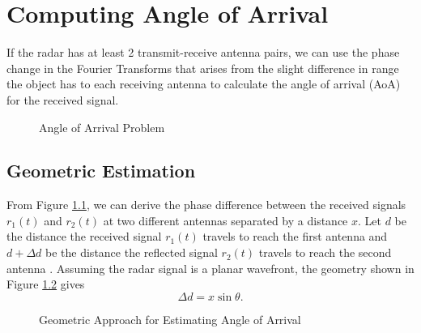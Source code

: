 \chapter{Computing Angle of Arrival}
If the radar has at least 2 transmit-receive antenna pairs, we can use the
phase change in the Fourier Transforms that arises from the slight difference
in range the object has to each receiving antenna to calculate the angle of
arrival (AoA) for the received signal. 

\begin{figure}[h]
	\center
	\caption{Angle of Arrival Problem}
	\label{fig:angle-of-arrival}
\end{figure}

\section{Geometric Estimation}
From Figure \ref{fig:angle-of-arrival}, we can derive the phase difference
between the received signals $r_1(t)$ and $r_2(t)$ at two different antennas
separated by a distance $x$. Let $d$ be the distance the received signal
$r_1(t)$ travels to reach the first antenna and $d + \Delta d$ be the distance
the reflected signal $r_2(t)$ travels to reach the second antenna
\cite{iovescu2017fundamentals}. Assuming the
radar signal is a planar wavefront, the geometry shown in Figure
\ref{fig:geometric-aoa} gives
\begin{equation}
	\Delta d = x \sin \theta. 
\end{equation}
\begin{figure}
	\center
	\caption{Geometric Approach for Estimating Angle of Arrival}
	\label{fig:geometric-aoa}
\end{figure}

